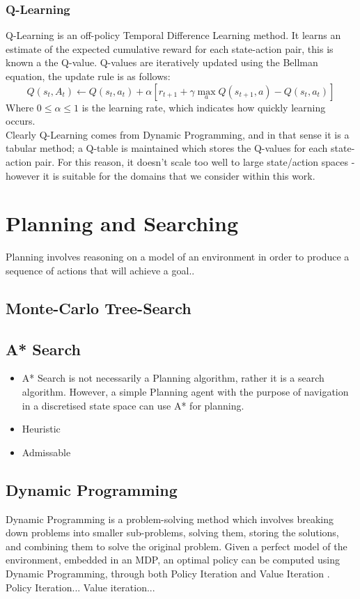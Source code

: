 \subsubsection{Q-Learning}
Q-Learning \cite{Watkins:1989, journals/ml/WatkinsD92} is an off-policy Temporal Difference Learning method. It learns an estimate of the expected cumulative reward for each state-action pair, this is known a the Q-value. Q-values are iteratively updated using the Bellman equation, the update rule is as follows:
$$Q(s_t,A_t) \leftarrow Q(s_t,a_t) + \alpha[r_{t+1} + \gamma \max_aQ(s_{t+1}, a) -Q(s_t,a_t)]$$
Where $0 \le \alpha \le 1$ is the learning rate, which indicates how quickly learning occurs.
\\Clearly Q-Learning comes from Dynamic Programming, and in that sense it is a tabular method; a Q-table is maintained which stores the Q-values for each state-action pair. For this reason, it doesn't scale too well to large state/action spaces - however it is suitable for the domains that we consider within this work.
\section{Planning and Searching}
Planning involves reasoning on a model of an environment in order to produce a sequence of actions that will achieve a goal.\cite{russelNorvig2003:aima}.
\subsection{Monte-Carlo Tree-Search}
\subsection{A* Search}
\begin{itemize}
    \item A* Search \cite{4082128} is not necessarily a Planning algorithm, rather it is a search algorithm. However, a simple Planning agent with the purpose of navigation in a discretised state space can use A* for planning.
    \item Heuristic
    \item Admissable
\end{itemize}
\subsection{Dynamic Programming}
Dynamic Programming \cite{Bellman:1957, DBLP:books/lib/Bertsekas05} is a problem-solving method which involves breaking down problems into smaller sub-problems, solving them, storing the solutions, and combining them to solve the original problem. Given a perfect model of the environment, embedded in an MDP, an optimal policy can be computed using Dynamic Programming, through both Policy Iteration \cite{Bellman:1957, howard:dp} and Value Iteration \cite{Bellman:1957}. Policy Iteration... Value iteration...

